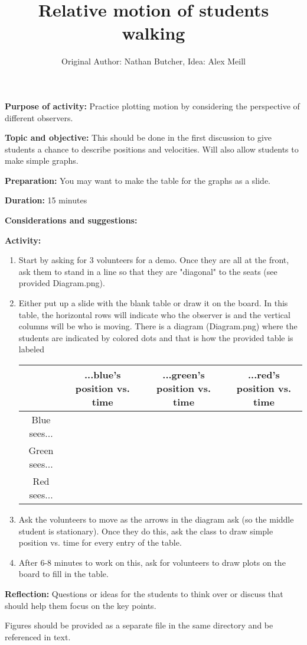 \documentclass{article}
\title{Relative motion of students walking}
\author{Original Author: Nathan Butcher, Idea: Alex Meill}
\date{}
\begin{document}
\maketitle
\thispagestyle{empty}

\textbf{Purpose of activity:} Practice plotting motion by considering the perspective of different observers.

\textbf{Topic and objective:} This should be done in the first discussion to give students a chance to describe positions and velocities. Will also allow students to make simple graphs. 

\textbf{Preparation:} You may want to make the table for the graphs as a slide.

\textbf{Duration:} 15 minutes

\textbf{Considerations and suggestions:}

\hspace{14pt}

\textbf{Activity:}
\begin{enumerate}
\item Start by asking for 3 volunteers for a demo. Once they are all at the front, ask them to stand in a line so that they are "diagonal" to the seats (see provided Diagram.png).
\item Either put up a slide with the blank table or draw it on the board. In this table, the horizontal rows will indicate who the observer is and the vertical columns will be who is moving. There is a diagram (Diagram.png) where the students are indicated by colored dots and that is how the provided table is labeled

\begin{tabular}{| c | c | c | c |}
	\hline
	 & ...blue's position vs. time & ...green's position vs. time & ...red's position vs. time \\ \hline
	 Blue sees... & & & \\ \hline
	 Green sees... & & & \\ \hline 
	 Red sees... & & & \\ \hline
\end{tabular}

\item Ask the volunteers to move as the arrows in the diagram ask (so the middle student is stationary). Once they do this, ask the class to draw simple position vs. time for every entry of the table. 

\item After 6-8 minutes to work on this, ask for volunteers to draw plots on the board to fill in the table.
\end{enumerate}

\textbf{Reflection:} Questions or ideas for the students to think over or discuss that should help them focus on the key points.

\hspace{14pt}

Figures should be provided as a separate file in the same directory and be referenced in text.
\end{document}

